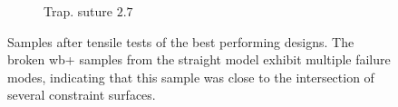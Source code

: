 \begin{figure}
\begin{subfigure}[B]{.22\columnwidth}
		\caption{Trap. suture $2.7$}
		\label{fig:failures_suture}
	\end{subfigure}
	\caption{Samples after tensile tests of the best performing designs.
		The broken wb+ samples from the straight model exhibit multiple failure modes, indicating that this sample was close to the intersection of several constraint surfaces.}
	\label{fig:failures}
\end{figure}






